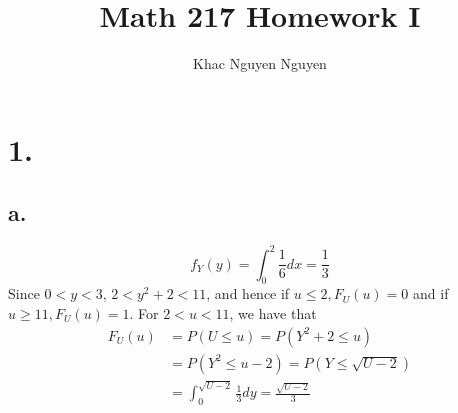 \documentclass[11pt]{article}
\title{\textbf{Math 217 Homework I}}
\author{Khac Nguyen Nguyen}
\date{}
\begin{document}
\section*{1.}
\subsection*{a.}
\[
    f_Y(y) = \int_0^2 \frac{1}{6}dx = \frac{1}{3} 
\]
Since $0<y<3$, $2<y^2 +2<11$, and hence if $u\le 2, F_U(u) = 0$ and if $u \ge 11, F_U(u) = 1$. For $2<u<11$, we have that
\begin{equation*}
    \begin{aligned}
        F_U(u) &= P(U\le u) = P(Y^2+2 \le u) \\
        &= P(Y^2 \le u-2) = P(Y \le \sqrt{U-2}) \\
        &= \int^{\sqrt{U-2}}_0 \frac{1}{3}dy = \frac{\sqrt{U-2}}{3}
    \end{aligned}
\end{equation*}
\end{document}
